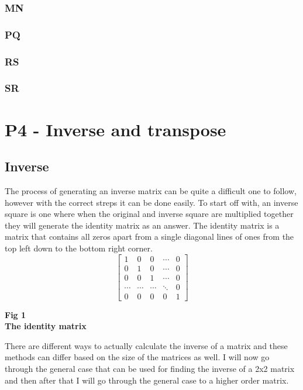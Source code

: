 \documentclass{article}
\begin{document}
\subsubsection{MN}
\subsubsection{PQ}
\subsubsection{RS}
\subsubsection{SR}

\section{P4 - Inverse and transpose}
\subsection{Inverse}
The process of generating an inverse matrix can be quite a difficult one to follow, however with the correct streps it can be done easily. To start off with, an inverse square is one where when the original and inverse square are multiplied together they will generate the identity matrix as an answer. The identity matrix is a matrix that contains all zeros apart from a single diagonal lines of ones from the top left down to the bottom right corner. 
\vspace{0.5cm}
	\[
	\begin{bmatrix}
		1 & 0 & 0 & \cdots & 0\\
		0 & 1 & 0 & \cdots & 0\\
		0 & 0 & 1 & \cdots & 0\\
		\cdots & \cdots & \cdots & \ddots & 0\\
		0 & 0 & 0 & 0 & 1
	\end{bmatrix}
	\]
	\begin{center}
		\small{ \textbf{Fig 1 \\ The identity matrix}}
	\end{center}

There are different ways to actually calculate the inverse of a matrix and these methods can differ based on the size of the matrices as well. I will now go through the general case that can be used for finding the inverse of a 2x2 matrix and then after that I will go through the general case to a higher order matrix.
\end{document}
